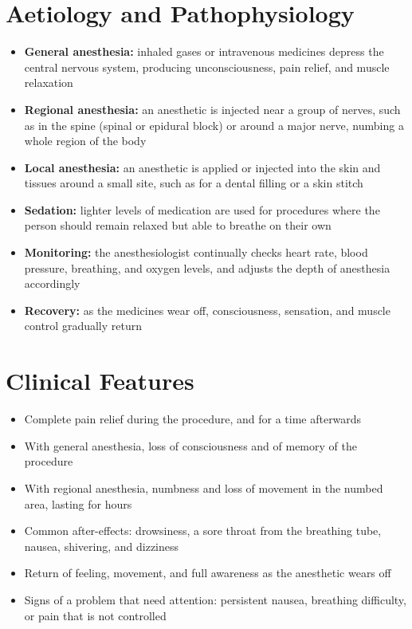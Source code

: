 \section*{Aetiology and Pathophysiology}
\begin{itemize}
    \item \textbf{General anesthesia:} inhaled gases or intravenous medicines depress the central nervous system, producing unconsciousness, pain relief, and muscle relaxation
    \item \textbf{Regional anesthesia:} an anesthetic is injected near a group of nerves, such as in the spine (spinal or epidural block) or around a major nerve, numbing a whole region of the body
    \item \textbf{Local anesthesia:} an anesthetic is applied or injected into the skin and tissues around a small site, such as for a dental filling or a skin stitch
    \item \textbf{Sedation:} lighter levels of medication are used for procedures where the person should remain relaxed but able to breathe on their own
    \item \textbf{Monitoring:} the anesthesiologist continually checks heart rate, blood pressure, breathing, and oxygen levels, and adjusts the depth of anesthesia accordingly
    \item \textbf{Recovery:} as the medicines wear off, consciousness, sensation, and muscle control gradually return
\end{itemize}

\section*{Clinical Features}
\begin{itemize}
    \item Complete pain relief during the procedure, and for a time afterwards
    \item With general anesthesia, loss of consciousness and of memory of the procedure
    \item With regional anesthesia, numbness and loss of movement in the numbed area, lasting for hours
    \item Common after-effects: drowsiness, a sore throat from the breathing tube, nausea, shivering, and dizziness
    \item Return of feeling, movement, and full awareness as the anesthetic wears off
    \item Signs of a problem that need attention: persistent nausea, breathing difficulty, or pain that is not controlled
\end{itemize}

